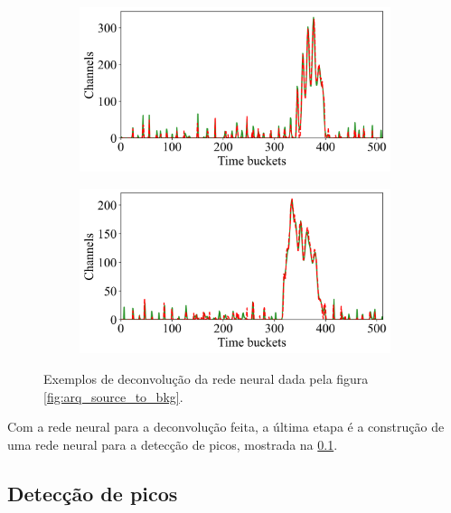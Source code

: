 \documentclass[a4paper,12pt,oneside]{book}
\begin{document}
\begin{figure}[H]
\begin{subfigure}[b]{0.465\textwidth}
        \caption{}
        \label{subfig:std_ex2}
    \end{subfigure}
    \begin{subfigure}[b]{0.49\textwidth}
        \centering
        \includegraphics[scale=0.425]{figs/swbtd_3.png}
        \caption{}
        \label{subfig:std_ex3}
    \end{subfigure}%
    \hfill
    \begin{subfigure}[b]{0.465\textwidth}
        \centering
        \includegraphics[scale=0.425]{figs/swbtd_4.png}
        \caption{}
        \label{subfig:std_ex4}
    \end{subfigure}
\caption{Exemplos de deconvolução da rede neural dada pela figura \ref{fig:arq_source_to_bkg}.}
\label{fig:std_examples}
\end{figure}

\par Com a rede neural para a deconvolução feita, a última etapa é a construção de uma rede neural para a detecção de picos, mostrada na \ref{subsec:pulso_ml_peaks}.

\subsection{Detecção de picos}\label{subsec:pulso_ml_peaks}
\end{document}
